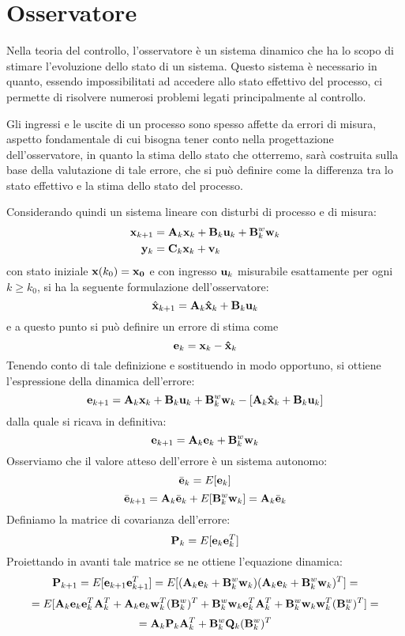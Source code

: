 \section{Osservatore}
Nella teoria del controllo, l'osservatore è un sistema dinamico che ha lo scopo di stimare l'evoluzione dello stato di un sistema. Questo sistema è necessario in quanto, essendo impossibilitati ad accedere allo stato effettivo del processo, ci permette di risolvere numerosi problemi legati principalmente al controllo.

Gli ingressi e le uscite di un processo sono spesso affette da errori di misura, aspetto fondamentale di cui bisogna  tener conto  nella progettazione dell'osservatore, in quanto la stima dello stato che otterremo, sarà costruita sulla base della valutazione di tale errore, che si può definire come la differenza tra lo stato effettivo e la stima dello stato del processo.

\noindent Considerando quindi un sistema lineare con disturbi di processo e di misura:
\begin{align*}
\mathbf{x}_{k+1} &= \mathbf{A}_k\mathbf{x}_k + \mathbf{B}_k\mathbf{u}_k + \mathbf{B}^w_k\mathbf{w}_k \\
\mathbf{y}_k &= \mathbf{C}_k\mathbf{x}_k + \mathbf{v}_k
\end{align*}
con stato iniziale $\mathbf{x}(k_0)=\mathbf{x_0}$ e con ingresso $\mathbf{u}_k$ misurabile  esattamente per ogni $k \geq k_0$, si ha la seguente formulazione dell'osservatore:
\[\hat{\mathbf{x}}_{k+1}=\mathbf{A}_k\mathbf{\hat{x}}_k+\mathbf{B}_k\mathbf{u}_k\]
e a questo punto si può definire un errore di stima come  
\[\mathbf{e}_k={\mathbf{x}}_k-{\mathbf{\hat{x}}}_k\]
Tenendo conto di tale definizione e sostituendo in modo opportuno, si ottiene l'espressione della dinamica dell'errore:
\[\mathbf{e}_{k+1}=\mathbf{A}_k\mathbf{x}_k+\mathbf{B}_k\mathbf{u}_k+\mathbf{B}^w_k\mathbf{w}_k-[\mathbf{A}_k\mathbf{\hat{x}}_k+\mathbf{B}_k\mathbf{u}_k]\]
dalla quale si ricava in definitiva:
\[\mathbf{e}_{k+1}=\mathbf{A}_k\mathbf{e}_k+\mathbf{B}^w_k\mathbf{w}_k\]
Osserviamo che il valore atteso dell'errore è un sistema autonomo:
\[\bar{\mathbf{e}}_k=E[\mathbf{e}_k]\]
\[\bar{\mathbf{e}}_{k+1}=\mathbf{A}_k\bar{\mathbf{e}}_k+ E[\mathbf{B}^w_k\mathbf{w}_k]=\mathbf{A}_k\bar{\mathbf{e}}_k\]
Definiamo la matrice di covarianza dell'errore:
\[\mathbf{P}_k=E[\mathbf{e}_k\mathbf{e}_k^T]\] 
Proiettando in avanti tale matrice se ne ottiene l'equazione dinamica:
\[\mathbf{P}_{k+1}=E[\mathbf{e}_{k+1}\mathbf{e}_{k+1}^T]=E[(\mathbf{A}_k\mathbf{e}_k+\mathbf{B}^w_k\mathbf{w}_k)(\mathbf{A}_k\mathbf{e}_k+\mathbf{B}^w_k\mathbf{w}_k)^T]=\]
\[=E[\mathbf{A}_k\mathbf{e}_k\mathbf{e}_k^T\mathbf{A}_k^T+\mathbf{A}_k\mathbf{e}_k\mathbf{w}_k^T(\mathbf{B}^w_k)^T+\mathbf{B}^w_k\mathbf{w}_k\mathbf{e}_k^T\mathbf{A}_k^T+\mathbf{B}^w_k\mathbf{w}_k\mathbf{w}_k^T(\mathbf{B}^w_k)^T]=\]
\[=\mathbf{A}_k\mathbf{P}_k\mathbf{A}_k^T+\mathbf{B}^w_k\mathbf{Q}_k(\mathbf{B}^w_k)^T\]
\newpage